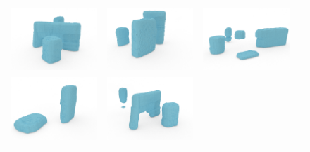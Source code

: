 \documentclass[10pt,twocolumn,letterpaper]{article}
\begin{document}
\begin{figure}
\begin{tabular}{cccc}
    \includegraphics[width=\scenewidth]{scene/cropped/test11_op_0} &
    \includegraphics[width=\scenewidth]{scene/cropped/learn13_op_0} &
    \includegraphics[width=\scenewidth]{scene/cropped/test45_op_0} \\
    \includegraphics[width=\scenewidth]{scene/cropped/learn12_op_1} &
    \includegraphics[width=\scenewidth]{scene/cropped/test11_op_1} &

\end{tabular}
\end{figure}
\end{document}
